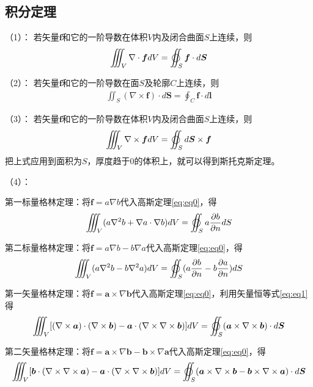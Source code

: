 \documentclass{article}
\numberwithin{equation}{section}
\renewcommand{\vec}[1]{\boldsymbol{#1}}
\begin{document}
\subsection{积分定理}
（1）\textbf{\color{blue}{高斯定理}}：
若矢量$\vec{f}$和它的一阶导数在体积$V$内及闭合曲面$S$上连续，则
\begin{align}
    \label{eq:eq0}
    \iiint _V \nabla \cdot \vec{f}dV=\varoiint _S \vec{f}\cdot d\vec{S}
\end{align}
\par
（2）\textbf{\color{blue}{斯托克斯定理}}：
若矢量$\vec{f}$和它的一阶导数在面$S$及轮廓$C$上连续，则
\begin{align}
    \iint _S (\nabla \times \vec{f}) \cdot d\vec{S}=\oint _C \vec{f}\cdot d\vec{l}
\end{align}
\par
（3）\textbf{\color{blue}{旋度定理}}：
若矢量$\vec{f}$和它的一阶导数在体积$V$内及闭合曲面$S$上连续，则
\begin{align}
    \iiint _V \nabla \times \vec{f}dV=\varoiint _S d\vec{S} \times \vec{f}
\end{align}
把上式应用到面积为$S$，厚度趋于0的体积上，就可以得到斯托克斯定理。
\par
（4）\textbf{\color{blue}{格林定理}}：
\par
第一标量格林定理：将$\vec{f}=a\nabla b$代入高斯定理\ref{eq:eq0}，得
\begin{align}
    \iiint _V (a \nabla^2 b + \nabla a \cdot \nabla b)dV=\varoiint _S a\frac{\partial b}{\partial n}dS
\end{align}
\par
第二标量格林定理：将$\vec{f}=a\nabla b-b\nabla a$代入高斯定理\ref{eq:eq0}，得
\begin{align}
    \iiint _V (a \nabla^2 b - b \nabla^2 a)dV=\varoiint _S (a\frac{\partial b}{\partial n}-b\frac{\partial a}{\partial n})dS
\end{align}
\par
第一矢量格林定理：将$\vec{f}=\vec{a}\times \nabla \vec{b}$代入高斯定理\ref{eq:eq0}，利用矢量恒等式\ref{eq:eq1}得
\begin{align}
    \iiint _V [(\nabla \times \vec{a})\cdot (\nabla \times \vec{b})-\vec{a}\cdot (\nabla \times \nabla \times \vec{b})]dV=\varoiint _S (\vec{a} \times \nabla \times \vec{b})\cdot d\vec{S}
\end{align}
\par
第二矢量格林定理：将$\vec{f}=\vec{a}\times \nabla \vec{b}-\vec{b}\times \nabla \vec{a}$代入高斯定理\ref{eq:eq0}，得
\begin{align}
    \label{eq:eq2}
    \iiint _V [\vec{b}\cdot (\nabla \times \nabla \times \vec{a})-\vec{a}\cdot (\nabla \times \nabla \times \vec{b})]dV=\varoiint _S (\vec{a} \times \nabla \times \vec{b}-\vec{b} \times \nabla \times \vec{a})\cdot d\vec{S}
\end{align}
\end{document}

